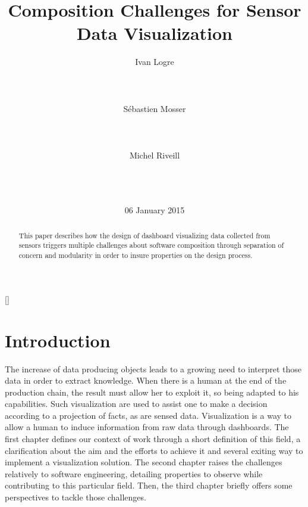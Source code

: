 \documentclass{acm_proc_article-sp}
\begin{document}
\title{Composition Challenges for Sensor Data Visualization}

\author{
\alignauthor Ivan Logre\\
       \\
       \\
       \\
\alignauthor S{\'e}bastien Mosser\\
       \\
       \\
       \\
\alignauthor Michel Riveill\\
       \\
       \\
       \\
}

\date{06 January 2015}

\maketitle
\begin{abstract}
This paper describes how the design of dashboard visualizing data collected from
sensors triggers multiple challenges about software composition through separation
of concern and modularity in order to insure properties on the design process.
\end{abstract}

[]


\section{Introduction}
The increase of data producing objects leads to a growing need to interpret those
data in order to extract knowledge. When there is a human at the end of the
production chain, the result must allow her to exploit it, so being adapted to his
capabilities. Such visualization are used to assist one to make a decision according
to a projection of facts, as are sensed data. Visualization is a way to allow a
human to induce information from raw data through dashboards. The first chapter
defines our context of work through a short definition of this field, a clarification
about the aim and the efforts to achieve it and several exiting way to implement
a visualization solution. The second chapter raises the challenges relatively to
software engineering, detailing properties to observe while contributing to this
particular field. Then, the third chapter briefly offers some perspectives to
tackle those challenges.
\end{document}
